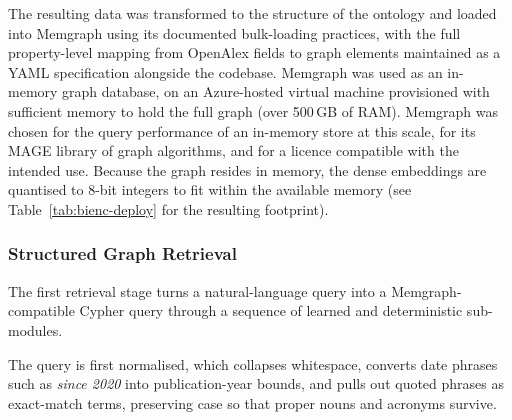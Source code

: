 The resulting data was transformed to the structure of the ontology and loaded into Memgraph using its documented bulk-loading practices, with the full property-level mapping from OpenAlex fields to graph elements maintained as a YAML specification alongside the codebase. Memgraph was used as an in-memory graph database, on an Azure-hosted virtual machine provisioned with sufficient memory to hold the full graph (over 500\,GB of RAM). %
Memgraph was chosen for the query performance of an in-memory store at this scale, for its MAGE library of graph algorithms, and for a licence compatible with the intended use. Because the graph resides in memory, the dense embeddings are quantised to 8-bit integers to fit within the available memory (see Table~\ref{tab:bienc-deploy} for the resulting footprint).

\subsubsection{Structured Graph Retrieval}
\label{subsubsec:structured-retrieval}

The first retrieval stage turns a natural-language query into a Memgraph-compatible Cypher query through a sequence of learned and deterministic sub-modules.

The query is first normalised, which collapses whitespace, converts date phrases such as \emph{since 2020} into publication-year bounds, and pulls out quoted phrases as exact-match terms, preserving case so that proper nouns and acronyms survive.

